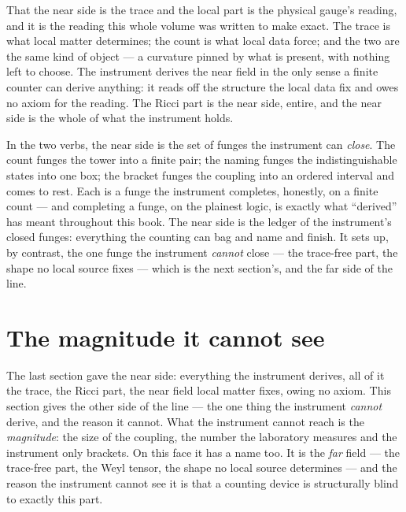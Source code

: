 That the near side is the trace and the local part is the physical gauge's reading, and it is the reading this whole volume
was written to make exact. The trace is what local matter determines; the count is what local data force; and the two are the
same kind of object --- a curvature pinned by what is present, with nothing left to choose. The instrument derives the near
field in the only sense a finite counter can derive anything: it reads off the structure the local data fix and owes no axiom
for the reading. The Ricci part is the near side, entire, and the near side is the whole of what the instrument holds.

In the two verbs, the near side is the set of funges the instrument can \emph{close}. The count funges the tower into a
finite pair; the naming funges the indistinguishable states into one box; the bracket funges the coupling into an ordered
interval and comes to rest. Each is a funge the instrument completes, honestly, on a finite count --- and completing a funge, on the
plainest logic, is exactly what ``derived'' has meant throughout this book. The near side is the ledger of the instrument's
closed funges: everything the counting can bag and name and finish. It sets up, by contrast, the one funge the instrument
\emph{cannot} close --- the trace-free part, the shape no local source fixes --- which is the next section's, and the far side
of the line.

\section{The magnitude it cannot see}

The last section gave the near side: everything the instrument derives, all of it the trace, the Ricci part, the near field
local matter fixes, owing no axiom. This section gives the other side of the line --- the one thing the instrument
\emph{cannot} derive, and the reason it cannot. What the instrument cannot reach is the \emph{magnitude}: the size of the
coupling, the number the laboratory measures and the instrument only brackets. On this face it has a name too. It is the
\emph{far} field --- the trace-free part, the Weyl tensor, the shape no local source determines --- and the reason the
instrument cannot see it is that a counting device is structurally blind to exactly this part.

